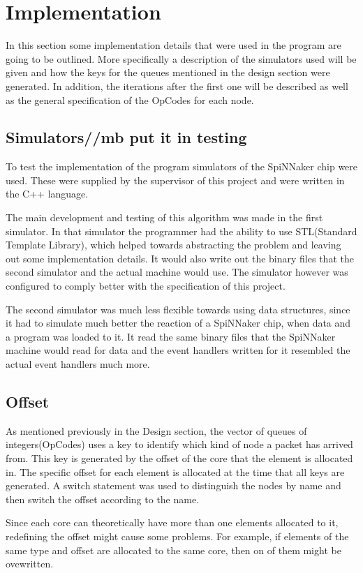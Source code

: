 \documentclass[12pt,a4paper]{article}
\begin{document}
\section{Implementation}
In this section some implementation details that were used in the program are going to be outlined. More specifically a description of the simulators used will be given and how the keys for the queues mentioned in the design section were generated. In addition, the iterations after the first one will be described as well as the general specification of the OpCodes for each node.
\subsection{Simulators//mb put it in testing}
To test the implementation of the program simulators of the SpiNNaker chip were used. These were supplied by the supervisor of this project and were written in the C++ language. 

The main development and testing of this algorithm was made in the first simulator. In that simulator the programmer had the ability to use STL(Standard Template Library), which helped towards abstracting the problem and leaving out some implementation details. It would also write out the binary files that the second simulator and the actual machine would use. The simulator however was configured to comply better with the specification of this project.

The second simulator was much less flexible towards using data structures, since it had to simulate much better the reaction of a SpiNNaker chip, when data and a program was loaded to it. It read the same binary files that the SpiNNaker machine would read for data and the event handlers written for it resembled the actual event handlers much more.

\subsection{Offset}
As mentioned previously in the Design section, the vector of queues of integers(OpCodes) uses a key to identify which kind of node a packet has arrived from. This key is generated by the offset of the core that the element is allocated in. The specific offset for each element is allocated at the time that all keys are generated. A switch statement was used to distinguish the nodes by name and then switch the offset according to the name. 

Since each core can theoretically have more than one elements allocated to it, redefining the offset might cause some problems. For example, if elements of the same type and offset are allocated to the same core, then on of them might be ovewritten. 
\end{document}
